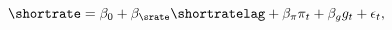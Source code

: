 \begin{equation} \label{eq:nTaylorRule}
	\shortrate = \beta_{0} + \beta_{\srate} \shortratelag + \beta_{\pi} \pi_{t} + \beta_{g} g_{t} + \epsilon_{t},
\end{equation}